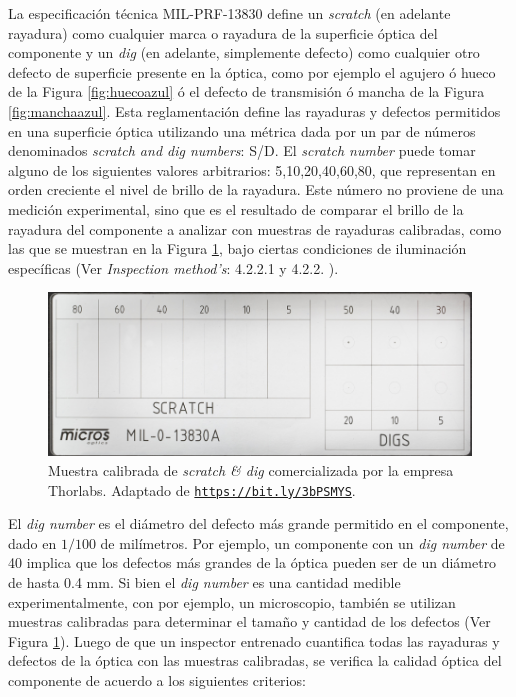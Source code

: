 \hspace{0.5cm}La especificación técnica MIL-PRF-13830 define un \textit{scratch} (en adelante rayadura) como cualquier marca o rayadura de la superficie óptica del componente y un \textit{dig} (en adelante, simplemente defecto) como cualquier otro defecto de superficie presente en la óptica, como por ejemplo el agujero ó hueco de la Figura \ref{fig:huecoazul} ó el defecto de transmisión ó mancha de la Figura \ref{fig:manchaazul}. Esta reglamentación define las rayaduras y defectos permitidos en una superficie óptica utilizando una métrica dada por un par de números denominados \textit{scratch and dig numbers}: S/D. El \textit{scratch number} puede tomar alguno de los siguientes valores arbitrarios: 5,10,20,40,60,80, que representan en orden creciente el nivel de brillo de la rayadura. Este número no proviene de una medición experimental, sino que es el resultado de comparar el brillo de la rayadura del componente a analizar con muestras de rayaduras calibradas, como las que se muestran en la Figura \ref{fig:scratchanddig}, bajo ciertas condiciones de iluminación específicas (Ver \textit{Inspection method's}: 4.2.2.1 y 4.2.2. \cite{milprf}).
\begin{figure}[H]
	\centering
	\includegraphics[scale=0.8]{Figs/cuantificaciondefectos/paddlecalibration.png}
	\caption{Muestra calibrada de \textit{scratch \& dig} comercializada por la empresa Thorlabs. Adaptado de \href{https://www.thorlabs.com/newgrouppage9.cfm?objectgroup_id=1427&pn=MOTP-MIL}{\texttt{https://bit.ly/3bPSMYS}}.}
	\label{fig:scratchanddig}
\end{figure}
El \textit{dig number} es el diámetro del defecto más grande permitido en el componente, dado en $1/100$ de milímetros. Por ejemplo, un componente con un \textit{dig number} de 40 implica que los defectos más grandes de la óptica pueden ser de un diámetro de hasta 0.4 mm. Si bien el \textit{dig number} es una cantidad medible experimentalmente, con por ejemplo, un microscopio, también se utilizan muestras calibradas para determinar el tamaño y cantidad de los defectos (Ver Figura \ref{fig:scratchanddig}). Luego de que un inspector entrenado cuantifica todas las rayaduras y defectos de la óptica con las muestras calibradas, se verifica la calidad óptica del componente de acuerdo a los siguientes criterios:
